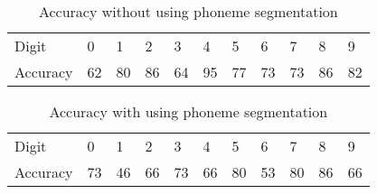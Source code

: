 \begin{center}
\begin{table}[]
    \centering
    \begin{tabular}{@{}lllllllllll@{}}
    \cmidrule(l){2-11}
    Digit    & 0  & 1  & 2  & 3  & 4  & 5  & 6  & 7  & 8  & 9  \\ \cmidrule(l){2-11} 
    Accuracy & 62 & 80 & 86 & 64 & 95 & 77 & 73 & 73 & 86 & 82 \\ \cmidrule(l){2-11} 
    \end{tabular}
    \caption{Accuracy without using phoneme segmentation}
    \end{table}
\end{center}
\begin{table}[]
    \centering
    \begin{tabular}{@{}lllllllllll@{}}
    \cmidrule(l){2-11}
    Digit    & 0  & 1  & 2  & 3  & 4  & 5  & 6  & 7  & 8  & 9  \\ \cmidrule(l){2-11} 
    Accuracy & 73 & 46 & 66 & 73 & 66 & 80 & 53 & 80 & 86 & 66 \\ \cmidrule(l){2-11} 
    \end{tabular}
    \caption{Accuracy with using phoneme segmentation}
    \end{table}
            